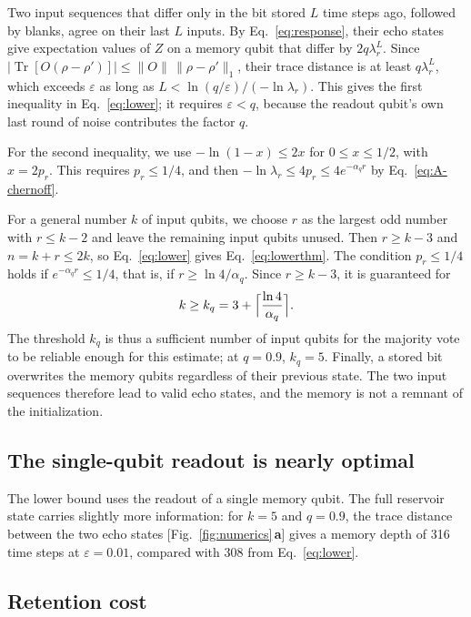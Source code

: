 \documentclass[aps,pra,reprint,superscriptaddress,floatfix]{revtex4-2}
\theoremstyle{plain}
\newcommand{\tr}{\operatorname{Tr}}
\newcommand{\Norm}[1]{\lVert #1\rVert}
\newcommand{\pnl}[1]{\textsf{\textbf{#1}}}
\begin{document}
Two input sequences that differ only in the bit stored $L$ time steps ago, followed by blanks, agree on their last $L$ inputs. By Eq.~\eqref{eq:response}, their echo states give expectation values of $Z$ on a memory qubit that differ by $2q\lambda_r^L$. Since $|\tr[O(\rho-\rho')]|\le\Norm O\,\Norm{\rho-\rho'}_1$, their trace distance is at least $q\lambda_r^L$, which exceeds $\varepsilon$ as long as $L<\ln(q/\varepsilon)/(-\ln\lambda_r)$. This gives the first inequality in Eq.~\eqref{eq:lower}; it requires $\varepsilon<q$, because the readout qubit's own last round of noise contributes the factor $q$.

For the second inequality, we use $-\ln(1-x)\le2x$ for $0\le x\le1/2$, with $x=2p_r$. This requires $p_r\le1/4$, and then $-\ln\lambda_r\le4p_r\le4e^{-\alpha_qr}$ by Eq.~\eqref{eq:A-chernoff}.

For a general number $k$ of input qubits, we choose $r$ as the largest odd number with $r\le k-2$ and leave the remaining input qubits unused. Then $r\ge k-3$ and $n=k+r\le2k$, so Eq.~\eqref{eq:lower} gives Eq.~\eqref{eq:lowerthm}. The condition $p_r\le1/4$ holds if $e^{-\alpha_qr}\le1/4$, that is, if $r\ge\ln4/\alpha_q$. Since $r\ge k-3$, it is guaranteed for
\begin{equation}
k\ge k_q=3+\Bigl\lceil\frac{\ln4}{\alpha_q}\Bigr\rceil .
\end{equation}
The threshold $k_q$ is thus a sufficient number of input qubits for the majority vote to be reliable enough for this estimate; at $q=0.9$, $k_q=5$. Finally, a stored bit overwrites the memory qubits regardless of their previous state. The two input sequences therefore lead to valid echo states, and the memory is not a remnant of the initialization.

\subsection{The single-qubit readout is nearly optimal}

The lower bound uses the readout of a single memory qubit. The full reservoir state carries slightly more information: for $k=5$ and $q=0.9$, the trace distance between the two echo states [Fig.~\ref{fig:numerics}\,\pnl{a}] gives a memory depth of 316 time steps at $\varepsilon=0.01$, compared with 308 from Eq.~\eqref{eq:lower}.

\subsection{Retention cost}
\end{document}
